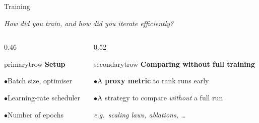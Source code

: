 \documentclass[aspectratio=169]{beamer}
\newcommand{\cardtitle}[2]{\textbf{\color{#1}#2}\par\vspace{5pt}}
\newcommand{\qitem}[1]{\textcolor{secondary}{\footnotesize$\bullet$}\hspace{4pt}#1\par\vspace{3pt}}
\begin{document}
\begin{frame}{Training}
  \begin{center}
    \small\itshape How did you train, and how did you iterate efficiently?
  \end{center}
  \vspace{0.35cm}

  \begin{columns}[T]
    \begin{column}{0.46\textwidth}
      \begin{qbox}{primary}{trow}
        \cardtitle{primary}{Setup}
        \footnotesize
        \qitem{Batch size, optimiser}
        \qitem{Learning-rate scheduler}
        \qitem{Number of epochs}
      \end{qbox}
    \end{column}

    \begin{column}{0.52\textwidth}
      \begin{qbox}{secondary}{trow}
        \cardtitle{secondary}{Comparing without full training}
        \footnotesize
        \qitem{A \textbf{proxy metric} to rank runs early}
        \qitem{A strategy to compare \emph{without} a full run}
        \vspace{2pt}
        {\itshape\color{primary!70} e.g.\ scaling laws, ablations, \ldots}
      \end{qbox}
    \end{column}
  \end{columns}
\end{frame}
\end{document}
